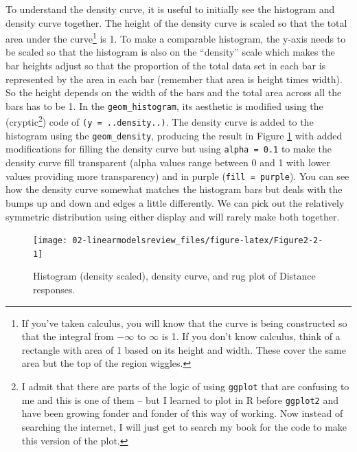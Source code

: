 \documentclass[
]{book}
\begin{document}
\indent To understand the density curve, it is useful to initially see
the histogram and density curve together. The height of the density curve is scaled
so that the total area under the curve\footnote{If you've taken calculus, you will
  know that the
  curve is being constructed so that the integral from \(-\infty\) to
  \(\infty\) is 1. If you don't know calculus, think of a rectangle with area
  of 1 based on its height and width. These cover the same area but the top of the
  region wiggles.} is 1. To make a comparable histogram, the
y-axis needs to be scaled so that the histogram is also on the ``density''
scale which makes the bar heights adjust so that the proportion of the
total data set in each bar is represented by the area in each bar
(remember that area is height times width). So the height depends on the
width of the bars and the total area across all the bars has to be 1. In the
\texttt{geom\_histogram}, its aesthetic is modified using the (cryptic\footnote{I admit that there are parts of the logic of using \texttt{ggplot} that are confusing to me and this is one of them -- but I learned to plot in R before \texttt{ggplot2} and have been growing fonder and fonder of this way of working. Now instead of searching the internet, I will just get to search my book for the code to make this version of the plot.}) code of \texttt{(y\ =\ ..density..)}. The
density curve is added to the histogram using the \texttt{geom\_density}, producing the result in Figure \ref{fig:Figure2-2} with
added modifications for filling the density curve but using \texttt{alpha\ =\ 0.1} to make the density curve fill transparent (alpha values range between 0 and 1 with lower values providing more transparency) and in purple (\texttt{fill\ =\ purple}). You can see how the density curve
somewhat matches the histogram bars but deals with the bumps up and down
and edges a little differently. We can pick out the relatively symmetric distribution using
either display and will rarely make both together. 



\begin{figure}[ht!]

{\centering \texttt{[image: 02-linearmodelsreview\_files/figure-latex/Figure2-2-1]} 

}

\caption{Histogram (density scaled), density curve, and rug plot of Distance responses.}\label{fig:Figure2-2}
\end{figure}
\end{document}
